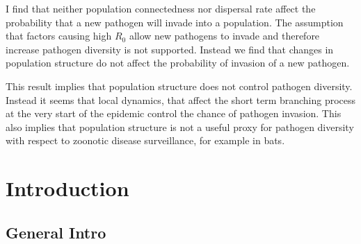 I find that neither population connectedness nor dispersal rate affect the probability that a new pathogen will invade into a population.
The assumption that factors causing high $R_0$ allow new pathogens to invade and therefore increase pathogen diversity is not supported.
Instead we find that changes in population structure do not affect the probability of invasion of a new pathogen.
 

This result implies that population structure does not control pathogen diversity.
Instead it seems that local dynamics, that affect the short term branching process at the very start of the epidemic control the chance of pathogen invasion.
This also implies that population structure is not a useful proxy for pathogen diversity with respect to zoonotic disease surveillance, for example in bats.









\section{Introduction}





\subsection{General Intro}


